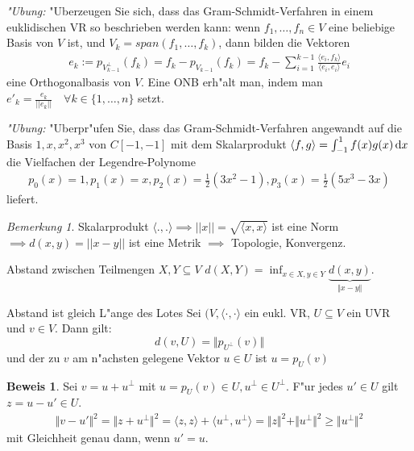 \documentclass[oneside,fontsize=11pt,paper=a4,BCOR=0mm,DIV=12,automark,headsepline]{scrbook}
\theoremstyle{remark}
\theoremstyle{definition}
\theoremstyle{definition}
\newtheorem*{prof}{Beweis}
\theoremstyle{remark}
\newtheorem*{bem}{Bemerkung}
\begin{document}
\emph{"Ubung:} "Uberzeugen Sie sich, dass das Gram-Schmidt-Verfahren in einem euklidischen VR so beschrieben werden kann: wenn \(f_1, \dots, f_n \in V\) eine beliebige Basis von \(V\) ist, und \(V_k = span(f_1, \dots, f_k)\), dann bilden die Vektoren \begin{align*}e_k := p_{V_{k-1}^\perp}(f_k) = f_k - p_{V_{k-1}}(f_k) = f_k - \sum_{i=1}^{k-1}\frac{\langle e_i, f_k\rangle}{\langle e_i, e_i\rangle}e_i\end{align*} eine Orthogonalbasis von \(V\). Eine ONB erh"alt man, indem man \(e'_k = \frac{e_k}{||e_k||} \quad\forall k\in \{1,\dots,n\}\) setzt.

\emph{"Ubung:} "Uberpr"ufen Sie, dass das Gram-Schmidt-Verfahren angewandt auf die Basis \(1, x, x^2, x^3\) von \(C[-1, -1]\) mit dem Skalarprodukt \(\langle f, g\rangle = \int_{-1}^1f(x)g(x)\dif x\) die Vielfachen der Legendre-Polynome
\begin{align*}
  p_0(x) = 1, p_1(x) = x, p_2(x) = \frac{1}{2}(3x^2 - 1), p_3(x) = \frac{1}{2}(5x^3 - 3x)
\end{align*}
liefert.

\begin{bem}
  Skalarprodukt \(\langle . , .\rangle \implies ||x|| = \sqrt{\langle x, x\rangle}\) ist eine Norm \(\implies d(x, y) = ||x-y||\) ist eine Metrik \(\implies\) Topologie, Konvergenz.
\end{bem}

\begin{definition}{Abstand zwischen Teilmengen $X,Y \subseteq V$}{}
  $d(X,Y)= \inf_{x\in X, y\in Y} \underbrace{d(x,y)}_{\Vert x - y\Vert}$.
\end{definition}

\begin{satz}{Abstand ist gleich L"ange des Lotes}{}
  Sei $(V, \langle {\cdot, \cdot} \rangle$ ein eukl. VR, $U\subseteq V$ ein UVR
  und $v\in V$. Dann gilt: \[d(v, U) = \Vert p_{U^\perp}(v)\Vert\] und der zu $v$ am
  n"achsten gelegene Vektor $u\in U$ ist $u=p_U(v)$
\end{satz}

\begin{prof}
  Sei \(v = u + u^\perp\) mit \(u = p_U(v) \in U, u^\perp \in U^\perp\). F"ur jedes \(u' \in U\) gilt \(z = u - u' \in U\).
  \begin{align*}
    \Vert v - u'\Vert^2 = \Vert z + u^\perp\Vert^2 = \langle z, z\rangle + \langle u^\perp , u^\perp\rangle = \Vert z\Vert^2 + \Vert u^\perp\Vert^2 \geq \Vert u^\perp\Vert^2
  \end{align*}
  mit Gleichheit genau dann, wenn \(u' = u\).
\end{prof}
\end{document}
